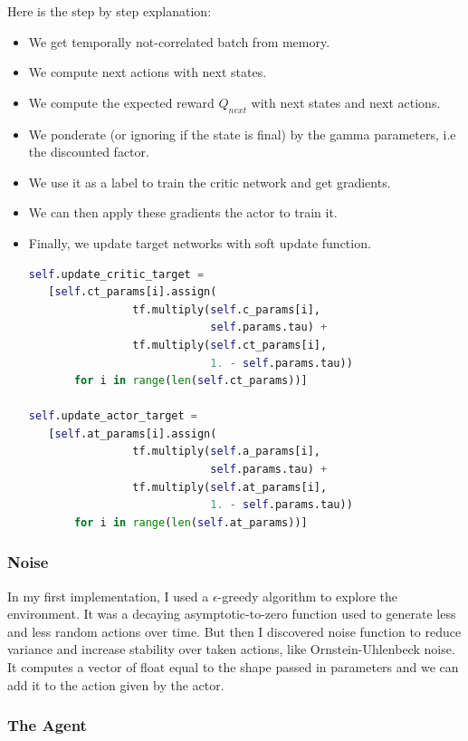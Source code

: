 \documentclass{article}
\begin{document}
Here is the step by step explanation:
\begin{itemize}
\item We get temporally not-correlated batch from memory.
\item We compute next actions with next states.
\item We compute the expected reward $Q_{next}$ with next states and next actions.
\item We ponderate (or ignoring if the state is final) by the gamma parameters,
  i.e the discounted factor.
\item We use it as a label to train the critic network and get gradients.
\item We can then apply these gradients the actor to train it.
\item Finally, we update target networks with soft update function.
  \begin{lstlisting}[language=Python]
self.update_critic_target =
   [self.ct_params[i].assign(
                tf.multiply(self.c_params[i], 
                            self.params.tau) + 
                tf.multiply(self.ct_params[i],
                            1. - self.params.tau))
       for i in range(len(self.ct_params))]
  
self.update_actor_target =
   [self.at_params[i].assign(
                tf.multiply(self.a_params[i], 
                            self.params.tau) +
                tf.multiply(self.at_params[i], 
                            1. - self.params.tau))
       for i in range(len(self.at_params))]
  \end{lstlisting}
\end{itemize}

\subsubsection{Noise}

In my first implementation, I used a $\epsilon$-greedy algorithm to explore the
environment. It was a decaying asymptotic-to-zero function used to generate less
and less random actions over time. But then I discovered noise function to
reduce variance and increase stability over taken actions, like
Ornstein-Uhlenbeck noise. It computes a vector of float equal to the shape
passed in parameters and we can add it to the action given by the actor.

\subsubsection{The Agent}
\end{document}
